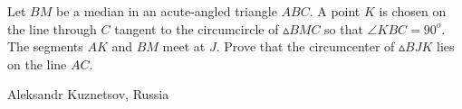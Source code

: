 Let $BM$ be a median in an acute-angled triangle $ABC$. A point $K$ is chosen on the line through $C$ tangent to the circumcircle of $\vartriangle BMC$ so that $\angle KBC = 90^o$. The segments $AK$ and $BM$ meet at $J$. Prove that the circumcenter of  $\vartriangle BJK$ lies on the line $AC$.

Aleksandr Kuznetsov, Russia
